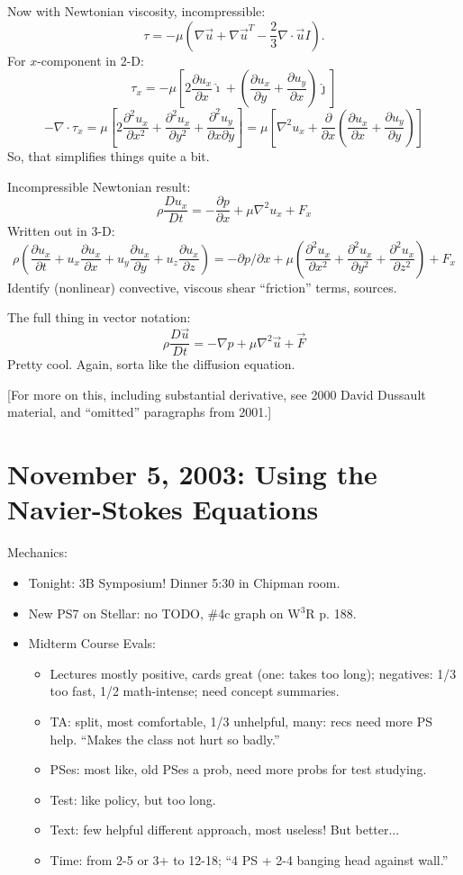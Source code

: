\documentclass{report}
\begin{document}
Now with Newtonian viscosity, incompressible:
$$\tau = -\mu\left(\nabla\vec{u} + \nabla\vec{u}^T -
  \frac{2}{3}\nabla\cdot\vec{u}I\right).$$
For $x$-component in 2-D:
$$\tau_x = -\mu\left[2\frac{\partial u_x}{\partial x}\hat{\imath} +
  \left(\frac{\partial u_x}{\partial y} +
    \frac{\partial u_y}{\partial x}\right)\hat{\jmath}\right]$$
$$-\nabla\cdot\tau_x = \mu\left[2\frac{\partial^2u_x}{\partial x^2} +
  \frac{\partial^2 u_x}{\partial y^2} +
  \frac{\partial^2 u_y}{\partial x\partial y}\right] =
\mu\left[\nabla^2 u_x + \frac{\partial}{\partial x}
  \left(\frac{\partial u_x}{\partial x} +
    \frac{\partial u_y}{\partial y}\right)\right]$$
So, that simplifies things quite a bit.

Incompressible Newtonian result:
$$\rho\frac{Du_x}{Dt} = -\frac{\partial p}{\partial x} + \mu\nabla^2u_x +F_x$$
Written out in 3-D:
$$\rho\left(\frac{\partial u_x}{\partial t} +
  u_x\frac{\partial u_x}{\partial x} + u_y\frac{\partial u_x}{\partial y} +
  u_z\frac{\partial u_x}{\partial z}\right) =
-\partial p/\partial x + \mu\left(\frac{\partial^2 u_x}{\partial x^2} +
  \frac{\partial^2 u_x}{\partial y^2} + \frac{\partial^2 u_x}{\partial z^2}
\right) + F_x$$
Identify (nonlinear) convective, viscous shear ``friction'' terms, sources.

The full thing in vector notation:
$$\rho\frac{D\vec{u}}{Dt} = -\nabla p + \mu\nabla^2\vec{u} + \vec{F}$$
Pretty cool.  Again, sorta like the diffusion equation.

[For more on this, including substantial derivative, see 2000 David Dussault
material, and ``omitted'' paragraphs from 2001.]
\newpage


\section{November 5, 2003: Using the Navier-Stokes Equations}

Mechanics:
\begin{itemize}
\item Tonight: 3B Symposium!  Dinner 5:30 in Chipman room.
\item New PS7 on Stellar: no TODO, \#4c graph on W$^3$R p. 188.
\item Midterm Course Evals:
  \begin{itemize}
  \item Lectures mostly positive, cards great (one: takes too long); negatives:
    1/3 too fast, 1/2 math-intense; need concept summaries.
  \item TA: split, most comfortable, 1/3 unhelpful, many: recs need more PS
    help.  ``Makes the class not hurt so badly.''
  \item PSes: most like, old PSes a prob, need more probs for test studying.
  \item Test: like policy, but too long.
  \item Text: few helpful different approach, most useless!  But better...
  \item Time: from 2-5 or 3+ to 12-18; ``4 PS + 2-4 banging head against
    wall.''
  \end{itemize}
\end{itemize}
\end{document}
